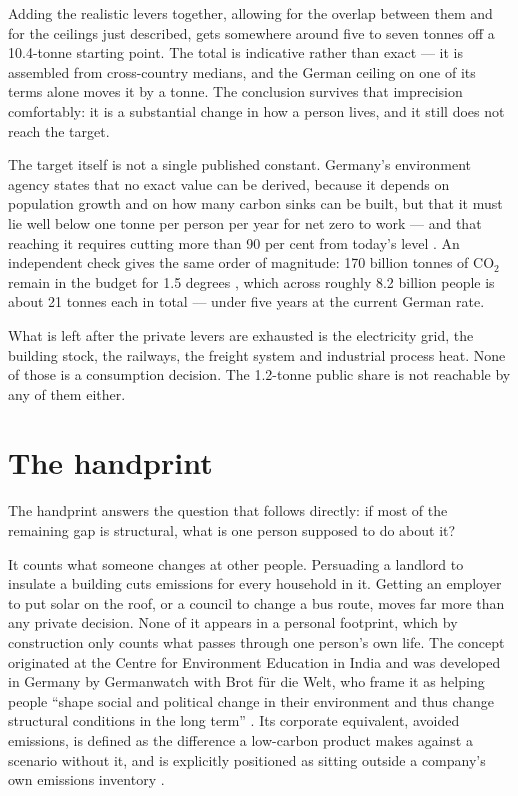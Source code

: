 \documentclass[11pt,a4paper]{article}
\begin{document}
Adding the realistic levers together, allowing for the overlap between them and for
the ceilings just described, gets somewhere around five to seven tonnes off a
10.4-tonne starting point. The total is indicative rather than exact — it is assembled
from cross-country medians, and the German ceiling on one of its terms alone moves it
by a tonne. The conclusion survives that imprecision comfortably: it is a substantial
change in how a person lives, and it still does not reach the target.

The target itself is not a single published constant. Germany's environment agency
states that no exact value can be derived, because it depends on population growth
and on how many carbon sinks can be built, but that it must lie well below one tonne
per person per year for net zero to work — and that reaching it requires cutting more
than 90 per cent from today's level \cite{uba-frage}. An independent check gives the
same order of magnitude: 170 billion tonnes of CO$_2$ remain in the budget for 1.5
degrees \cite{gcb2025}, which across roughly 8.2 billion people is about 21 tonnes
each in total — under five years at the current German rate.

What is left after the private levers are exhausted is the electricity grid, the
building stock, the railways, the freight system and industrial process heat. None of
those is a consumption decision. The 1.2-tonne public share is not reachable by any
of them either.

\section{The handprint}

The handprint answers the question that follows directly: if most of the remaining
gap is structural, what is one person supposed to do about it?

It counts what someone changes at other people. Persuading a landlord to insulate a
building cuts emissions for every household in it. Getting an employer to put solar
on the roof, or a council to change a bus route, moves far more than any private
decision. None of it appears in a personal footprint, which by construction only
counts what passes through one person's own life. The concept originated at the
Centre for Environment Education in India and was developed in Germany by Germanwatch
with Brot für die Welt, who frame it as helping people \enquote{shape social and
political change in their environment and thus change structural conditions in the
long term} \cite{germanwatch,handabdruck}. Its corporate equivalent, avoided
emissions, is defined as the difference a low-carbon product makes against a scenario
without it, and is explicitly positioned as sitting outside a company's own emissions
inventory \cite{wbcsd}.
\end{document}
